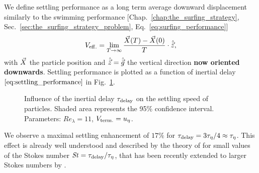 We define settling performance as a long term average downward displacement similarly to the swimming performance [Chap.~\ref{chap:the_surfing_strategy}, Sec.~\ref{sec:the_surfing_strategy_problem}, Eq.~\eqref{eq:surfing_performance}]
\begin{equation}
	\label{eq:settling_performance}
	V_{\mathrm{eff.}} = \lim_{T\to\infty} \frac{\vec{X} (T) - \vec{X} (0)}{T} \cdot \hat{\vec{z}},
\end{equation}
with $\vec{X}$ the particle position and $\hat{\vec{z}} = \hat{\vec{g}}$ the vertical direction \textbf{now oriented downwards}.
Settling performance is plotted as a function of inertial delay $\ref{eq:settling_performance}$ in Fig.~\ref{fig:passive_inertial_delay}.
\begin{figure}
	\centering
	
	\caption[Influence of the inertial delay $\InertialDelay$ on the settling speed of particles.]{
		Influence of the inertial delay $\InertialDelay$ on the settling speed of particles.
		Shaded area represents the 95\% confidence interval.
		Parameters: $\mathit{Re}_{\lambda} = 11$, $V_{\mathrm{term.}} = u_{\eta}$.
	}
	\label{fig:passive_inertial_delay}
\end{figure}
We observe a maximal settling enhancement of $17\%$ for $\tau_{\mathrm{delay}} = 3\tau_{\eta}/4 \approx \tau_{\eta}$.
This effect is already well understood and described by the theory of \citet{maxey1987gravitational} for small values of the Stokes number $\mathit{St} = \tau_{\mathrm{delay}} / \tau_{\eta}$, that has been recently extended to larger Stokes numbers by \citet{tom2019multiscale}.

